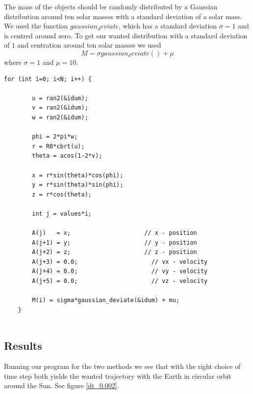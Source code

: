 \documentclass[a4paper,12pt, english]{article}
\begin{document}
The mass of the objects should be randomly distributed by a Gaussian distribution around ten solar masses with a standard deviation of a solar mass. We used the function $gaussian_deviate$, which has a standard deviation $ \sigma = 1$ and is centred around zero. To get our wanted distribution with a standard deviation of $1$ and centration around ten solar masses we used  
$$ M = \sigma gaussian_deviate() + \mu $$
where $\sigma = 1$ and $\mu = 10$. 

\begin{lstlisting}[title={Initial conditions for the N-body system}]
    for (int i=0; i<N; i++) {

        u = ran2(&idum);
        v = ran2(&idum);
        w = ran2(&idum);

        phi = 2*pi*w;
        r = R0*cbrt(u);
        theta = acos(1-2*v);

        x = r*sin(theta)*cos(phi);
        y = r*sin(theta)*sin(phi);
        z = r*cos(theta);

        int j = values*i;

        A(j)   = x;                     // x - position
        A(j+1) = y;                     // y - position
        A(j+2) = z;                     // z - position
        A(j+3) = 0.0;                     // vx - velocity
        A(j+4) = 0.0;                     // vy - velocity
        A(j+5) = 0.0;                     // vz - velocity

        M(i) = sigma*gaussian_deviate(&idum) + mu;
    }
  
\end{lstlisting}
   
\subsection*{Results}

Running our program for the two methods we see that with the right choice of time step both yields the wanted trajectory with the Earth in circular orbit around the Sun. See figure \ref{dt_0.002}. 
\end{document}
